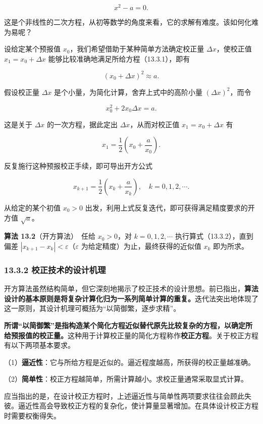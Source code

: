 \[
x^2-a=0.
\tag{13.3.1}
\]

这是个非线性的二次方程，从初等数学的角度来看，它的求解有难度。该如何化难为易呢？

设给定某个预报值 \(x_0\)，我们希望借助于某种简单方法确定校正量 \(\Delta x\)，使校正值 \(x_1=x_0+\Delta x\) 能够比较准确地满足所给方程（13.3.1），即有

\[
(x_0+\Delta x)^2\approx a.
\]

假设校正量 \(\Delta x\) 是个小量，为简化计算，舍弃上式中的高阶小量 \((\Delta x)^2\)，而令

\[
x_0^2+2x_0\Delta x=a.
\]

这是关于 \(\Delta x\) 的一次方程，据此定出 \(\Delta x\)，从而对校正值 \(x_1=x_0+\Delta x\) 有

\[
x_1=\frac{1}{2}\left(x_0+\frac{a}{x_0}\right).
\]

反复施行这种预报校正手续，即可导出开方公式

\[
x_{k+1}=\frac{1}{2}\left(x_k+\frac{a}{x_k}\right),\quad k=0,1,2,\cdots.
\tag{13.3.2}
\]

从给定的某个初值 \(x_0>0\) 出发，利用上式反复迭代，即可获得满足精度要求的开方值 \(\sqrt{a}\)。

\textbf{算法 13.2}（开方算法）　任给 \(x_0>0\)，对 \(k=0,1,2,\cdots\) 执行算式（13.3.2），直到偏差 \(|x_{k+1}-x_k|<\varepsilon\)（\(\varepsilon\) 为给定精度）为止，最终获得的近似值 \(x_k\) 即为所求。

\subsubsection{13.3.2 校正技术的设计机理}\label{ch13-ux6821ux6b63ux6280ux672fux7684ux8bbeux8ba1ux673aux7406}

开方算法虽然结构简单，但它深刻地揭示了校正技术的设计思想。前已指出，\textbf{算法设计的基本原则是将复杂计算化归为一系列简单计算的重复。}迭代法突出地体现了这一原则，其设计机理可概括为``以简御繁，逐步求精''。

\textbf{所谓``以简御繁''是指构造某个简化方程近似替代原先比较复杂的方程，以确定所给预报值的校正量。}这种用于计算校正量的简化方程称作\textbf{校正方程}。关于校正方程有以下两项基本要求。

（1）\textbf{逼近性}：它与所给方程是近似的。逼近程度越高，所获得的校正量越准确。

（2）\textbf{简单性}：校正方程越简单，所需计算越小。求校正量通常采取显式计算。

应当指出的是，在设计校正方程时，上述逼近性与简单性两项要求往往会顾此失彼。逼近性高会导致校正方程的复杂化，使计算量显著增加。在具体设计校正方程时需要权衡得失。

